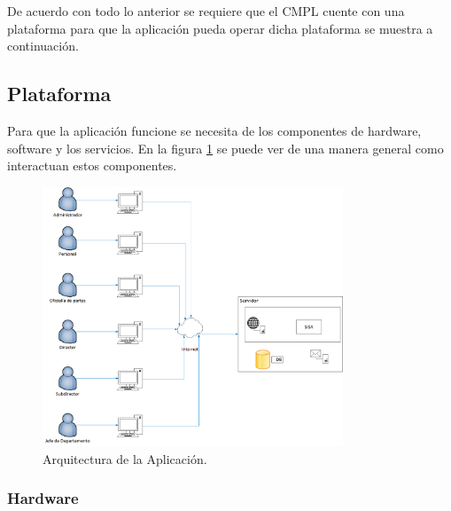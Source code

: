 De acuerdo con todo lo anterior se requiere que el CMPL cuente con una plataforma para que la aplicación pueda operar dicha plataforma se muestra a continuación.


\subsection{Plataforma}

Para que la aplicación funcione se necesita de los componentes de hardware, software y los servicios. En la figura \ref{arquitectura} se puede ver de una manera general como interactuan estos componentes. \\

\begin{figure}[htbp!]
		\centering
			\includegraphics[width=0.8\textwidth]{images/propuesta/arquitectura}
		\caption{Arquitectura de la Aplicación.}
		\label{arquitectura}
	\end{figure}

\subsubsection{Hardware}

